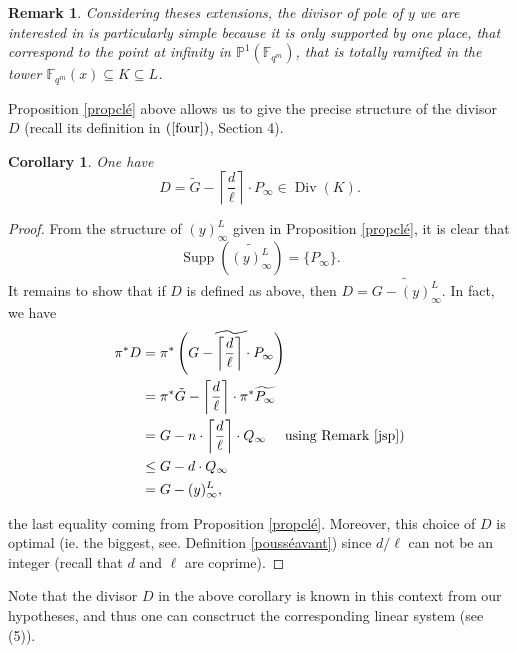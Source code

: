 \documentclass[10pt]{article}
\newtheorem{coro1}[thm]{Corollary}
\newtheorem{rq1}[thm]{Remark}
\newcommand{\s}{\vspace{0.3cm}}
\newcommand{\cd}{\cdot}
\newcommand{\PP}{\mathbb{P}}
\newcommand{\fqm}{\mathbb{F}_{q^m}}
\newcommand{\su}{\subseteq}
\newcommand{\Div}{\operatorname{Div}}
\newcommand{\Supp}{\operatorname{Supp}}
\begin{document}
\s

\begin{rq1} \rm Considering theses extensions, the divisor of pole of $y$ we are interested in is particularly simple because it is only supported by one place, that correspond to the point at infinity in $\PP^1(\fqm)$, that is totally ramified in the tower $\fqm(x)\su K \su L$.
\end{rq1}

\s

Proposition \ref{propclé} above allows us to give the precise structure of the divisor $D$ (recall its definition in $(\ref{four})$, Section 4).

\s

\begin{coro1} \label{diviseurDKummer}
One have
\[D = \tilde{G} - \left\lceil\frac{d}{\ell}\right\rceil \cd P_{\infty} \in \Div(K).\]
\end{coro1}

\s

\begin{proof}
From the structure of $(y)^L_{\infty}$ given in Proposition \ref{propclé}, it is clear that 
\[\Supp\left(\widetilde{(y)^L_{\infty}}\right) = \{P_{\infty}\}.\]
It remains to show that if $D$ is defined as above, then $D = \widetilde{G - (y)^L_{\infty}}$. In fact, we have
\begin{align*}
\pi^*D &= \pi^* \left(\widetilde{G - \left\lceil\frac{d}{\ell}\right\rceil \cd P_{\infty}}\right) \\
&= \pi^*\tilde{G} - \left\lceil\frac{d}{\ell}\right\rceil \cd \pi^*\widetilde{P_{\infty}} \\
&= G - n \cd \left\lceil\frac{d}{\ell}\right\rceil \cd Q_{\infty} \ \quad \textrm{using Remark \ref{jsp}}) \\
& \leq G - d \cd Q_{\infty} \\
&= G-(y)^L_{\infty},
\end{align*}

the last equality coming from Proposition \ref{propclé}. Moreover, this choice of $D$ is optimal (ie. the biggest, see. Definition \ref{pousséavant}) since $d/\ell$ can not be an integer (recall that $d$ and $\ell$ are coprime).
\end{proof}

\s

Note that the divisor $D$ in the above corollary is known in this context from our hypotheses, and thus one can consctruct the corresponding linear system (see (5)).
\end{document}
